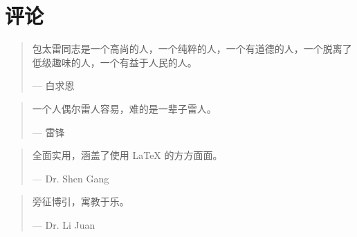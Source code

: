 \chapter{评论}

\begin{quotation}
包太雷同志是一个高尚的人，一个纯粹的人，一个有道德的人，一个脱离了低级趣味的人，一个有益于人民的人。
\begin{flushright}
  --- 白求恩
\end{flushright}
\end{quotation}

\begin{quotation}
一个人偶尔雷人容易，难的是一辈子雷人。
\begin{flushright}
  --- 雷锋
\end{flushright}
\end{quotation}

\begin{quotation}
全面实用，涵盖了使用 LaTeX 的方方面面。
\begin{flushright}
  --- Dr. Shen Gang
\end{flushright}
\end{quotation}

\begin{quotation}
旁征博引，寓教于乐。
\begin{flushright}
  --- Dr. Li Juan
\end{flushright}
\end{quotation}
    



